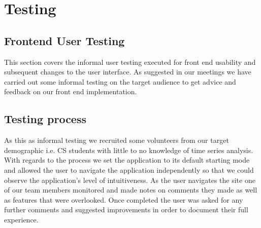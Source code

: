 \section{Testing}
\subsection{Frontend User Testing}
This section covers the informal user testing executed for front end usability and subsequent changes to the user interface. As suggested in our meetings we have carried out some informal testing on the target audience to get advice and feedback on our front end implementation. 

\subsection{Testing process}
As this as informal testing we recruited some volunteers from our target demographic i.e. CS students with little to no knowledge of time series analysis. With regards to the process we set the application to its default starting mode and allowed the user to navigate the application independently so that we could observe the application's level of intuitiveness. As the user navigates the site one of our team members monitored and made notes on comments they made as well as features that were overlooked. Once completed the user was asked for any further comments and suggested improvements in order to document their full experience.

